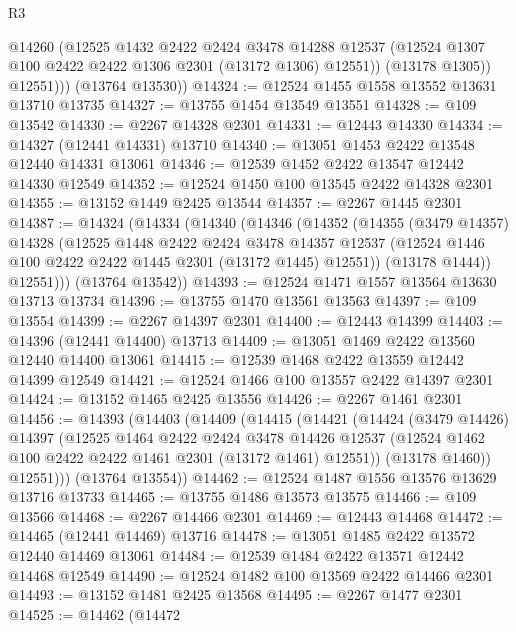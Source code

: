 \begin{lexlean}{R3}
\begin{coremodule}
              @14260
              (@12525
                @1432
                @2422
                @2424
                @3478
                @14288
                @12537
                (@12524 @1307 @100 @2422 @2422 @1306 @2301 (@13172 @1306) @12551))
              (@13178 @1305))
            @12551)))
      (@13764 @13530))
@14324 := @12524 @1455 @1558 @13552 @13631 @13710 @13735
@14327 := @13755 @1454 @13549 @13551
@14328 := @109 @13542
@14330 := @2267 @14328 @2301
@14331 := @12443 @14330
@14334 := @14327 (@12441 @14331) @13710
@14340 := @13051 @1453 @2422 @13548 @12440 @14331 @13061
@14346 := @12539 @1452 @2422 @13547 @12442 @14330 @12549
@14352 := @12524 @1450 @100 @13545 @2422 @14328 @2301
@14355 := @13152 @1449 @2425 @13544
@14357 := @2267 @1445 @2301
@14387 := @14324
    (@14334
      (@14340
        (@14346
          (@14352
            (@14355
              (@3479 @14357)
              @14328
              (@12525
                @1448
                @2422
                @2424
                @3478
                @14357
                @12537
                (@12524 @1446 @100 @2422 @2422 @1445 @2301 (@13172 @1445) @12551))
              (@13178 @1444))
            @12551)))
      (@13764 @13542))
@14393 := @12524 @1471 @1557 @13564 @13630 @13713 @13734
@14396 := @13755 @1470 @13561 @13563
@14397 := @109 @13554
@14399 := @2267 @14397 @2301
@14400 := @12443 @14399
@14403 := @14396 (@12441 @14400) @13713
@14409 := @13051 @1469 @2422 @13560 @12440 @14400 @13061
@14415 := @12539 @1468 @2422 @13559 @12442 @14399 @12549
@14421 := @12524 @1466 @100 @13557 @2422 @14397 @2301
@14424 := @13152 @1465 @2425 @13556
@14426 := @2267 @1461 @2301
@14456 := @14393
    (@14403
      (@14409
        (@14415
          (@14421
            (@14424
              (@3479 @14426)
              @14397
              (@12525
                @1464
                @2422
                @2424
                @3478
                @14426
                @12537
                (@12524 @1462 @100 @2422 @2422 @1461 @2301 (@13172 @1461) @12551))
              (@13178 @1460))
            @12551)))
      (@13764 @13554))
@14462 := @12524 @1487 @1556 @13576 @13629 @13716 @13733
@14465 := @13755 @1486 @13573 @13575
@14466 := @109 @13566
@14468 := @2267 @14466 @2301
@14469 := @12443 @14468
@14472 := @14465 (@12441 @14469) @13716
@14478 := @13051 @1485 @2422 @13572 @12440 @14469 @13061
@14484 := @12539 @1484 @2422 @13571 @12442 @14468 @12549
@14490 := @12524 @1482 @100 @13569 @2422 @14466 @2301
@14493 := @13152 @1481 @2425 @13568
@14495 := @2267 @1477 @2301
@14525 := @14462
    (@14472

\end{coremodule}
\end{lexlean}
